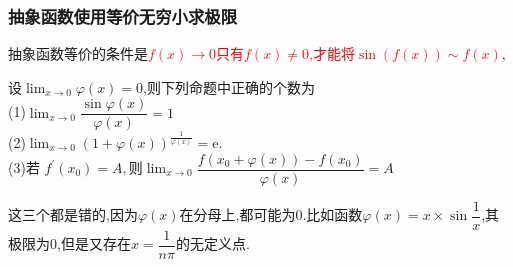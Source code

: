 \documentclass[8pt a4paper, oneside, UTF8]{ctexbook}
\begin{document}
\begin{sloppypar}
    \subsubsection{抽象函数使用等价无穷小求极限}
    抽象函数等价的条件是\textcolor{red}{$f(x) \to 0$只有$f(x) \neq 0$,才能将$\sin(f(x))\sim f(x)$},
    \begin{problem}
        设$\lim_{x\to0}\varphi(x)=0$,则下列命题中正确的个数为\\
        (1)$\lim_{x\to0}\dfrac{\sin\varphi(x)}{\varphi(x)}=1$\\
        (2)$\lim_{x\to0}(1+\varphi(x))^{\frac{1}{\varphi(x)}}=\mathrm{e}.$\\
        (3)$\text{若 }f^{\prime}(x_{0})=A,\text{则}\operatorname*{lim}_{x\to0}\dfrac{f(x_{0}+\varphi(x))-f(x_{0})}{\varphi(x)}=A$\\
    \end{problem}
    \begin{solution}
        这三个都是错的,因为$\varphi(x)$在分母上,都可能为0.比如函数$\varphi(x)=x\times\sin\dfrac{1}{x}$,其极限为0,但是又存在$x=\dfrac{1}{n\pi}$的无定义点.
    \end{solution}

\end{sloppypar}
\end{document}

